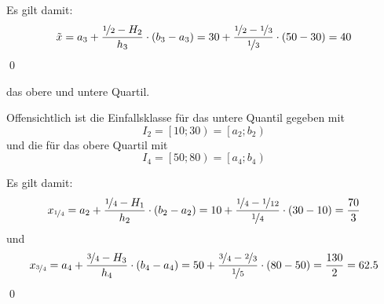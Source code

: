 \documentclass{abgabe}
\begin{document}
\begin{questions}
\begin{parts}
\begin{subparts}
\begin{solution}
                Es gilt damit:
                \[
                    \tilde{x} = a_3 + \frac{\nicefrac{1}{2} - H_2}{h_3} \cdot (b_3 - a_3) = 30 + \frac{\nicefrac{1}{2} - \nicefrac{1}{3}}{\nicefrac{1}{3}}  \cdot (50 - 30) = 40
                \]
                \qed
            \end{solution}

            \subpart
            das obere und untere Quartil.
            \begin{solution}
                Offensichtlich ist die Einfallsklasse für das untere Quantil gegeben mit
                \[
                    I_2 = \left[ 10 ; 30 \right) = \left[ a_2 ; b_2 \right)
                \]
                und die für das obere Quartil mit
                \[
                    I_4 = \left[ 50 ; 80 \right) = \left[ a_4 ; b_4 \right)
                \]

                Es gilt damit:
                \[
                    x_{\nicefrac{1}{4}} = a_2 + \frac{\nicefrac{1}{4} - H_1}{h_2} \cdot (b_2 - a_2) = 10 + \frac{\nicefrac{1}{4} - \nicefrac{1}{12}}{\nicefrac{1}{4}} \cdot (30 - 10) = \frac{70}{3}
                \]
                und
                \[
                    x_{\nicefrac{3}{4}} = a_4 + \frac{\nicefrac{3}{4} - H_3}{h_4} \cdot (b_4 - a_4) = 50 + \frac{\nicefrac{3}{4} - \nicefrac{2}{3}}{\nicefrac{1}{5}} \cdot (80 - 50) = \frac{130}{2} = 62.5
                \]
                \qed
            \end{solution}
        \end{subparts}

    \end{parts}
\end{questions}
\end{document}
